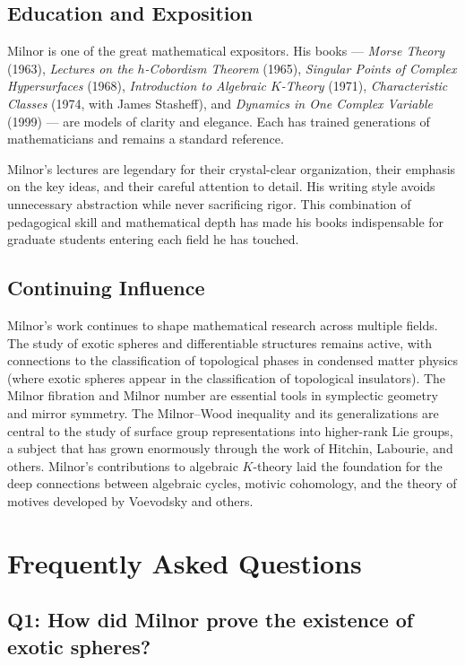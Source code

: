 \subsection{Education and Exposition}

Milnor is one of the great mathematical expositors. His books --- \textit{Morse Theory} (1963), \textit{Lectures on the \(h\)-Cobordism Theorem} (1965), \textit{Singular Points of Complex Hypersurfaces} (1968), \textit{Introduction to Algebraic \(K\)-Theory} (1971), \textit{Characteristic Classes} (1974, with James Stasheff), and \textit{Dynamics in One Complex Variable} (1999) --- are models of clarity and elegance. Each has trained generations of mathematicians and remains a standard reference.

Milnor's lectures are legendary for their crystal-clear organization, their emphasis on the key ideas, and their careful attention to detail. His writing style avoids unnecessary abstraction while never sacrificing rigor. This combination of pedagogical skill and mathematical depth has made his books indispensable for graduate students entering each field he has touched.

\subsection{Continuing Influence}

Milnor's work continues to shape mathematical research across multiple fields. The study of exotic spheres and differentiable structures remains active, with connections to the classification of topological phases in condensed matter physics (where exotic spheres appear in the classification of topological insulators). The Milnor fibration and Milnor number are essential tools in symplectic geometry and mirror symmetry. The Milnor--Wood inequality and its generalizations are central to the study of surface group representations into higher-rank Lie groups, a subject that has grown enormously through the work of Hitchin, Labourie, and others. Milnor's contributions to algebraic \(K\)-theory laid the foundation for the deep connections between algebraic cycles, motivic cohomology, and the theory of motives developed by Voevodsky and others.

\section{Frequently Asked Questions}

\subsection*{Q1: How did Milnor prove the existence of exotic spheres?}

